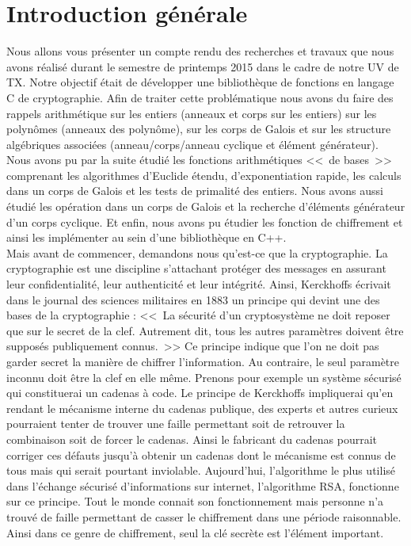\chapter{Introduction générale}


Nous allons vous présenter un compte rendu des recherches et travaux que nous avons réalisé durant le semestre de printemps 2015 dans le cadre de notre UV de TX. Notre objectif était de développer une bibliothèque de fonctions en langage C de cryptographie. Afin de traiter cette problématique nous avons du faire des rappels arithmétique sur les entiers (anneaux et corps sur les entiers) sur les polynômes (anneaux des polynôme), sur les corps de Galois et sur les structure algébriques associées (anneau/corps/anneau cyclique et élément générateur). 
Nous avons pu par la suite étudié les fonctions arithmétiques <<~de bases~>> comprenant les algorithmes d'Euclide étendu, d'exponentiation rapide, les calculs dans un corps de Galois et les tests de primalité des entiers. Nous avons aussi étudié les opération dans un corps de Galois et la recherche d'éléments générateur d'un corps cyclique. Et enfin, nous avons pu étudier les fonction de chiffrement et ainsi les implémenter au sein d’une bibliothèque en C++.\\


Mais avant de commencer, demandons nous qu’est-ce que la cryptographie. La cryptographie est une discipline s’attachant protéger des messages en assurant leur confidentialité, leur authenticité et leur intégrité. Ainsi, Kerckhoffs écrivait dans le journal des sciences militaires en 1883 un principe qui devint une des bases de la cryptographie :  <<~La sécurité d’un cryptosystème ne doit reposer que sur le secret de la clef. Autrement dit, tous les autres paramètres doivent être supposés publiquement connus.~>> Ce principe indique que l’on ne doit pas garder secret la manière de chiffrer l’information. Au contraire, le seul paramètre inconnu doit être la clef en elle même. Prenons pour exemple un système sécurisé qui constituerai un cadenas à code. Le principe de Kerckhoffs impliquerai qu’en rendant le mécanisme interne du cadenas publique, des experts et autres curieux pourraient tenter de trouver une faille permettant soit de retrouver la combinaison soit de forcer le cadenas. Ainsi le fabricant du cadenas pourrait corriger ces défauts jusqu’à obtenir un cadenas dont le mécanisme est connus de tous mais qui serait pourtant inviolable. Aujourd’hui, l’algorithme le plus utilisé dans l’échange sécurisé d’informations sur internet, l’algorithme RSA, fonctionne sur ce principe. Tout le monde connait son fonctionnement mais personne n’a trouvé de faille permettant de casser le chiffrement dans une période raisonnable. Ainsi dans ce genre de chiffrement, seul la clé secrète est l’élément important.\\

